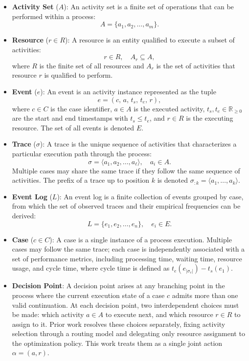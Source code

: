 \documentclass[journal,onecolumn]{IEEEtran}
\begin{document}
\begin{itemize}

    \item \textbf{Activity Set} (\(A\)):
    An activity set is a finite set of operations that can be
    performed within a process:
    \[
        A = \{ a_1, a_2, \dots, a_m \}.
    \]

    \item \textbf{Resource} (\(r \in R\)):
    A resource is an entity qualified to execute a subset of
    activities:
    \[
        r \in R, \quad A_r \subseteq A,
    \]
    where $R$ is the finite set of all resources and $A_r$ is the
    set of activities that resource $r$ is qualified to perform.

    \item \textbf{Event} (\(e\)):
    An event is an activity instance represented as the tuple
    \[
        e = (c,\, a,\, t_s,\, t_e,\, r),
    \]
    where $c \in C$ is the case identifier, $a \in A$ is the
    executed activity, $t_s, t_e \in \mathbb{R}_{\geq 0}$ are the
    start and end timestamps with $t_s \leq t_e$, and $r \in R$
    is the executing resource. The set of all events is denoted
    $E$.

    \item \textbf{Trace} (\(\sigma\)):
     A trace is the unique sequence of activities that characterizes
    a particular execution path through the process:
    \[
        \sigma = \langle a_1, a_2, \dots, a_\ell \rangle,
        \quad a_i \in A.
    \]
    Multiple cases may share the same trace if they follow the
    same sequence of activities. The prefix of a trace up to
    position $k$ is denoted $\sigma_{:k} = \langle a_1, \dots,
    a_k \rangle$.

    \item \textbf{Event Log} (\(L\)):
    An event log is a finite collection of events grouped by
    case, from which the set of observed traces and their
    empirical frequencies can be derived:
    \[
        L = \{ e_1, e_2, \dots, e_n \}, \quad e_i \in E.
    \]

    \item \textbf{Case} (\(c \in C\)):
    A case is a single instance of a process execution. Multiple
    cases may follow the same trace; each case is independently
    associated with a set of performance metrics, including
    processing time, waiting time, resource usage, and cycle
    time, where cycle time is defined as
    $t_e(e_{|\sigma_c|}) - t_s(e_1)$.

    \item \textbf{Decision Point}:
    A decision point arises at any branching point in the process
    where the current execution state of a case $c$ admits more
    than one valid continuation. At each decision point, two
    interdependent choices must be made: which activity $a \in A$
    to execute next, and which resource $r \in R$ to assign to it.
    Prior work resolves these choices separately, fixing activity
    selection through a routing model and delegating only resource
    assignment to the optimization policy. This work treats them
    as a single joint action $\alpha = (a, r)$.

\end{itemize}
\end{document}
